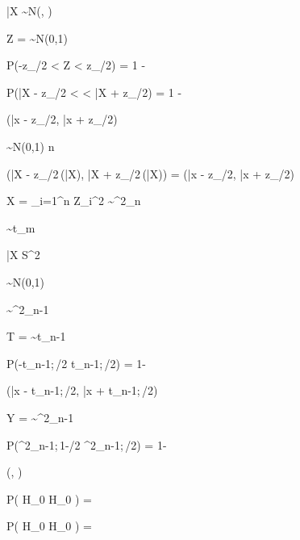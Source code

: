 \documentclass{minimal}
\begin{document}
\bar{X} \sim N\!\left(\mu, \right)

Z =  \sim N(0,1)

P\!\left(-z_{\alpha/2} < Z < z_{\alpha/2}\right) = 1 - \alpha

P\!\left(\bar{X} - z_{\alpha/2} < \mu < \bar{X} + z_{\alpha/2}\right) = 1 - \alpha

\left(\bar{x} - z_{\alpha/2},\; \bar{x} + z_{\alpha/2}\right)

 \sim N(0,1)  n \to \infty

\left(\bar{X} - z_{\alpha/2}\,(\bar{X}),\; \bar{X} + z_{\alpha/2}\,(\bar{X})\right)
= \left(\bar{x} - z_{\alpha/2},\; \bar{x} + z_{\alpha/2}\right)

X = \sum_{i=1}^n Z_i^2 \sim \chi^2_n

 \sim t_m

\bar{X}  S^2 

 \sim N(0,1)

 \sim \chi^2_{n-1}

T =  \sim t_{n-1}

P\!\left(-t_{n-1;\,\alpha/2} \leq {} \leq t_{n-1;\,\alpha/2}\right) = 1-\alpha

\left(\bar{x} - t_{n-1;\,\alpha/2},\; \bar{x} + t_{n-1;\,\alpha/2}\right)

Y =  \sim \chi^2_{n-1}

P\!\left(\chi^2_{n-1;\,1-\alpha/2} \leq {} \leq \chi^2_{n-1;\,\alpha/2}\right) = 1-\alpha

\left(,\; \right)


P( H_0 \mid H_0 ) = \alpha

P( H_0 \mid H_0 ) = \beta
\end{document}
